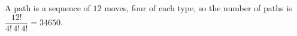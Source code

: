 A path is a sequence of $12$ moves, four of each type, so the number of paths is $\dfrac{12!}{4!\,4!\,4!}=\boxed{34650}$.
